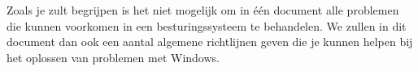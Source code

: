 Zoals je zult begrijpen is het niet mogelijk om in \'e\'en document alle problemen die kunnen voorkomen in een besturingssysteem te behandelen. We zullen in dit document dan ook een aantal algemene richtlijnen geven die je kunnen helpen bij het oplossen van problemen met Windows.

